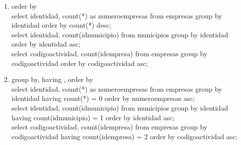 \documentclass[10pt]{article}         %
\begin{document}
\begin{enumerate}
\item order by \\
 select identidad, count(*) as numeroempresas from empresas group by identidad order by count(*) desc; \\
 select identidad, count(idmunicipio) from municipios group by identidad order by identidad asc; \\
 select codigoactividad, count(idempresa) from empresas group by codigoactividad order by codigoactividad asc; 

\item group by, having , order by \\
 select identidad, count(*) as numeroempresas from empresas group by identidad having count(*) = 0 order by numeroempresas asc; \\
 select identidad, count(idmunicipio) from municipios group by identidad having count(idmunicipio) = 1 order by identidad asc; \\
 select codigoactividad, count(idempresa) from empresas group by codigoactividad having count(idempresa) = 2  order by codigoactividad asc; 


\end{enumerate}
\end{document}
